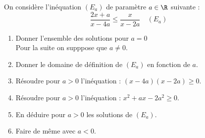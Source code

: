 



\begin{exercice}
On considère l'inéquation $(E_a)$ de paramètre $a\in \R$ suivante  :
$$ \frac{2x+a}{x-4a}  \leq \frac{x}{x-2a} \quad (E_a)$$

\begin{enumerate}
\item Donner l'ensemble des solutions pour $a=0$\\

Pour la suite on supppose que $a\neq 0$.
\item Donner le domaine de définition de $(E_a)$ en fonction de $a$. 
\item Résoudre pour $a>0$ l'inéquation : $(x-4a)(x-2a)\geq 0$.
\item Résoudre pour $a>0$ l'inéquation : $x^2+ax-2a^2\geq 0$.
\item En déduire pour $a>0$ les solutions de $(E_a)$. 
\item Faire de même avec $a<0$. 
\end{enumerate}
\end{exercice}
